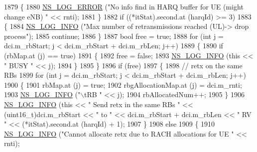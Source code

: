 \begin{DoxyCode}
1879                 \{
1880                   \hyperlink{group__logging_ga0261a8db1d4ac5f79417d117634fd455}{NS\_LOG\_ERROR} (\textcolor{stringliteral}{"No info find in HARQ buffer for UE (might change eNB) "} << 
      rnti);
1881                 \}
1882               \textcolor{keywordflow}{if} ((*itStat).second.at (harqId) >= 3)
1883                 \{
1884                   \hyperlink{group__logging_gafbd73ee2cf9f26b319f49086d8e860fb}{NS\_LOG\_INFO} (\textcolor{stringliteral}{"Max number of retransmissions reached (UL)-> drop process"});
1885                   \textcolor{keywordflow}{continue};
1886                 \}
1887               \textcolor{keywordtype}{bool} free = \textcolor{keyword}{true};
1888               \textcolor{keywordflow}{for} (\textcolor{keywordtype}{int} j = dci.m\_rbStart; j < dci.m\_rbStart + dci.m\_rbLen; j++)
1889                 \{
1890                   \textcolor{keywordflow}{if} (rbMap.at (j) == \textcolor{keyword}{true})
1891                     \{
1892                       free = \textcolor{keyword}{false};
1893                       \hyperlink{group__logging_gafbd73ee2cf9f26b319f49086d8e860fb}{NS\_LOG\_INFO} (\textcolor{keyword}{this} << \textcolor{stringliteral}{" BUSY "} << j);
1894                     \}
1895                 \}
1896               \textcolor{keywordflow}{if} (free)
1897                 \{
1898                   \textcolor{comment}{// retx on the same RBs}
1899                   \textcolor{keywordflow}{for} (\textcolor{keywordtype}{int} j = dci.m\_rbStart; j < dci.m\_rbStart + dci.m\_rbLen; j++)
1900                     \{
1901                       rbMap.at (j) = \textcolor{keyword}{true};
1902                       rbgAllocationMap.at (j) = dci.m\_rnti;
1903                       \hyperlink{group__logging_gafbd73ee2cf9f26b319f49086d8e860fb}{NS\_LOG\_INFO} (\textcolor{stringliteral}{"\(\backslash\)tRB "} << j);
1904                       rbAllocatedNum++;
1905                     \}
1906                   \hyperlink{group__logging_gafbd73ee2cf9f26b319f49086d8e860fb}{NS\_LOG\_INFO} (\textcolor{keyword}{this} << \textcolor{stringliteral}{" Send retx in the same RBs "} << (uint16\_t)dci.m\_rbStart 
      << \textcolor{stringliteral}{" to "} << dci.m\_rbStart + dci.m\_rbLen << \textcolor{stringliteral}{" RV "} << (*itStat).second.at (harqId) + 1);
1907                 \}
1908               \textcolor{keywordflow}{else}
1909                 \{
1910                   \hyperlink{group__logging_gafbd73ee2cf9f26b319f49086d8e860fb}{NS\_LOG\_INFO} (\textcolor{stringliteral}{"Cannot allocate retx due to RACH allocations for UE "} << rnti);

\end{DoxyCode}
